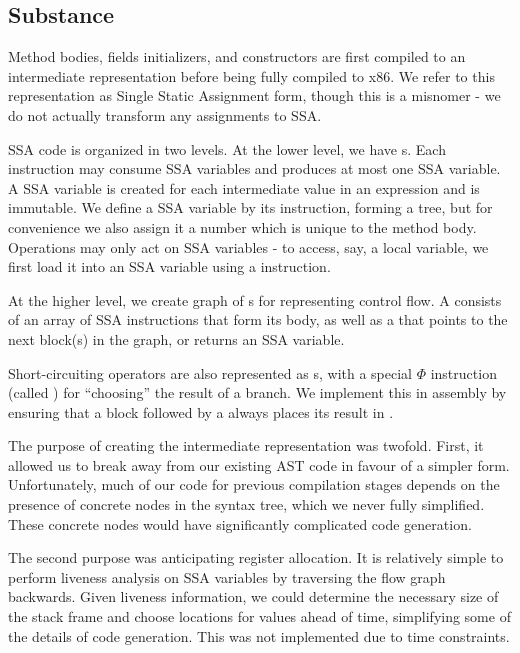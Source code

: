 \documentclass[pdftex,11pt,a4paper]{article}
\begin{document}
\subsection{Substance}

Method bodies, fields initializers, and constructors are first compiled to an
intermediate representation before being fully compiled to x86. We refer to this
representation as Single Static Assignment form, though this is a misnomer - we
do not actually transform any assignments to SSA.

SSA code is organized in two levels. At the lower level, we have
s. Each instruction may consume SSA variables and produces at
most one SSA variable. A SSA variable is created for each intermediate value in
an expression and is immutable. We define a SSA variable by its instruction,
forming a tree, but for convenience we also assign it a number which is unique to
the method body. Operations may only act on SSA variables - to access, say, a
local variable, we first load it into an SSA variable using a 
instruction.

At the higher level, we create graph of s for representing
control flow. A  consists of an array of SSA instructions that
form its body, as well as a  that points to the next block(s)
in the graph, or returns an SSA variable.

Short-circuiting operators are also represented as s, with a
special $\Phi$ instruction (called ) for ``choosing'' the result of a
branch. We implement this in assembly by ensuring that a block followed by a
 always places its result in .

The purpose of creating the intermediate representation was twofold. First, it
allowed us to break away from our existing AST code in favour of a simpler form.
Unfortunately, much of our code for previous compilation stages depends on the
presence of concrete nodes in the syntax tree, which we never fully simplified.
These concrete nodes would have significantly complicated code generation.

The second purpose was anticipating register allocation. It is relatively simple
to perform liveness analysis on SSA variables by traversing the flow graph
backwards. Given liveness information, we could determine the necessary size of
the stack frame and choose locations for values ahead of time, simplifying some
of the details of code generation. This was not implemented due to time
constraints.
\end{document}
